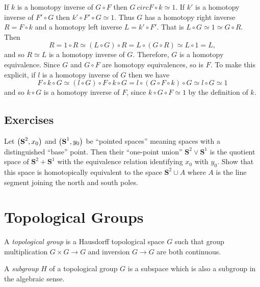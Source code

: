 \documentclass[letterpaper, 11pt, oneside]{book}
\begin{document}
\begin{pf}
   If $k$ is a homotopy inverse of $G \circ F$ then $G\ circ F \circ k \simeq 1$.
   If $k'$ is a homotopy inverse of $F' \circ G$ then $k' \circ F' \circ G \simeq 1$.
   Thus $G$ has a homotopy right inverse $R = F \circ k$ and a homotopy left inverse $L = k' \circ F'$.
   That is $L \circ G \simeq 1 \simeq G \circ R$.
   Then
   \[
     R = 1 \circ R \simeq (L \circ G) \circ R = L \circ (G \circ R) \simeq L \circ 1 = L,
   \]
   and so $R \simeq L$ is a homotopy inverse of $G$.
   Therefore, $G$ is a homotopy equivalence.
   Since $G$ and $G \circ F$ are homotopy equivalences, so is $F$.
   To make this explicit, if $l$ is a homotopy inverse of $G$ then we have
   \[
     F \circ k \circ G \simeq (l \circ G) \circ F \circ k \circ G = l \circ (G \circ F \circ k) \circ G \simeq l \circ G \simeq 1
   \]
   and so $k \circ G$ is a homotopy inverse of $F$, since $k \circ G \circ F \simeq 1$ by the definition of $k$.
\end{pf}

\clearpage

\section*{Exercises}

\begin{exercise}
  Let $\pqty{\textbf{S}^{2}, x_{0}}$ and $\pqty{\textbf{S}^{1}, y_{0}}$ be ``pointed spaces'' meaning spaces with a distinguished ``base'' point.
  Then their ``one-point union'' $\textbf{S}^{2} \lor \textbf{S}^{1}$ is the quotient space of $\textbf{S}^{2} + \textbf{S}^{1}$ with the equivalence relation identifying $x_{0}$ with $y_{0}$.
  Show that this space is homotopically equivalent to the space $\textbf{S}^{2} \cup A$ where $A$ is the line segment joining the north and south poles.
\end{exercise}

\clearpage

\chapter{Topological Groups}

\begin{defn}
  A \emph{topological group} is a Hausdorff topological space $G$ such that group multiplication $G \times G \to G$ and inversion $G \to G$ are both continuous.
\end{defn}

\begin{defn}[Subgroup]
  A \emph{subgroup} $H$ of a topological group $G$ is a subspace which is also a subgroup in the algebraic sense.
\end{defn}
\end{document}
